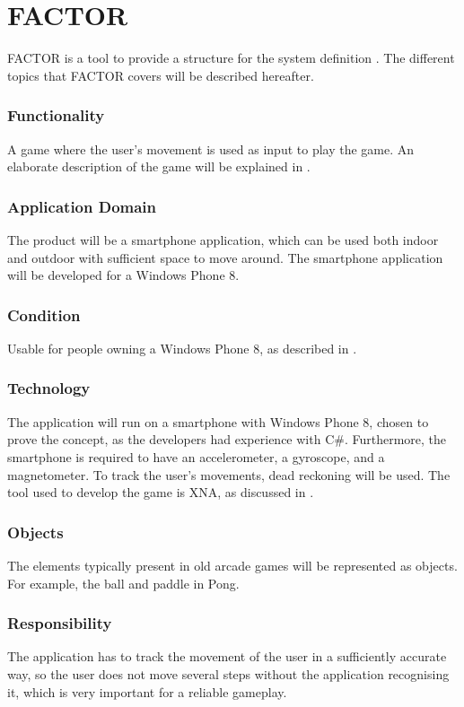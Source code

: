 \section{FACTOR}\label{section:factor}
FACTOR is a tool to provide a structure for the system definition \citep{book:OOAD}. 
The different topics that FACTOR covers will be described hereafter.

\subsubsection*{Functionality}
A game where the user's movement is used as input to play the game.
An elaborate description of the game will be explained in .

\subsubsection*{Application Domain}
The product will be a smartphone application, which can be used both indoor and outdoor with sufficient space to move around. 
The smartphone application will be developed for a Windows Phone 8.

\subsubsection*{Condition}
Usable for people owning a Windows Phone 8, as described in .

\subsubsection*{Technology}
The application will run on a smartphone with Windows Phone 8, chosen to prove the concept, as the developers had experience with C\#.
Furthermore, the smartphone is required to have an accelerometer, a gyroscope, and a magnetometer. 
To track the user's movements, dead reckoning will be used.
The tool used to develop the game is XNA, as discussed in .

\subsubsection*{Objects}
The elements typically present in old arcade games will be represented as objects. For example, the ball and paddle in Pong. 

\subsubsection*{Responsibility}
The application has to track the movement of the user in a sufficiently accurate way, so the user does not move several steps without the application recognising it, which is very important for a reliable gameplay.




